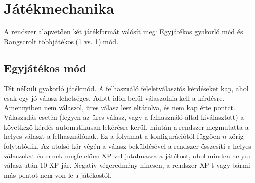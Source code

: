 \chapter{Játékmechanika}
A rendszer alapvetően két játékformát valósít meg: Egyjátékos gyakorló mód és Rangsorolt többjátékos (1 vs. 1) mód. 

\section{Egyjátékos mód}
Tét nélküli gyakorló játékmód. A felhasználó feleletválasztós kérdéseket kap, ahol csak egy jó válasz lehetséges. Adott időn belül válaszolnia kell a kérdésre. Amennyiben nem válaszol, üres válasz lesz eltárolva, és nem kap érte pontot. Válaszadás esetén (legyen az üres válasz, vagy a felhasználó által kiválasztott) a következő kérdés automatikusan lekérésre kerül, miután a rendszer megmutatta a helyes választ a felhasználónak. Ez a folyamat a konfigurációtól függően $n$ körig folytatódik. Az utolsó kör végén a válasz beküldésével a rendszer összesíti a helyes válaszokat és ennek megfelelően XP-vel jutalmazza a játékost, ahol minden helyes válasz után 10 XP jár. Negatív végeredmény nincsen, a rendszer XP-t vagy bármi más pontot nem von le a játékostól.
